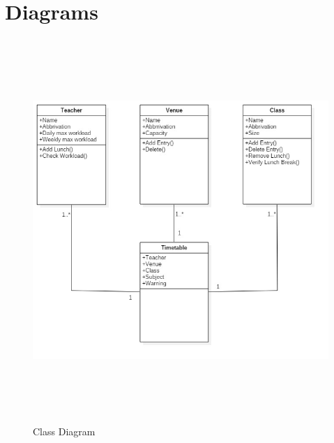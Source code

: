 \documentclass[a4paper,12pt,onecolumn]{report}
\begin{document}






\thispagestyle{empty}
\tableofcontents
%
%
%
%

\listoftables
{}


%

\listoffigures
{}

\newpage
{}









\chapter{Diagrams}

\begin{figure}[ht!]
	\centering
	\includegraphics[height=145mm, width=130mm]{classd.jpg}
	\caption{Class Diagram}
\end{figure}
\end{document}
